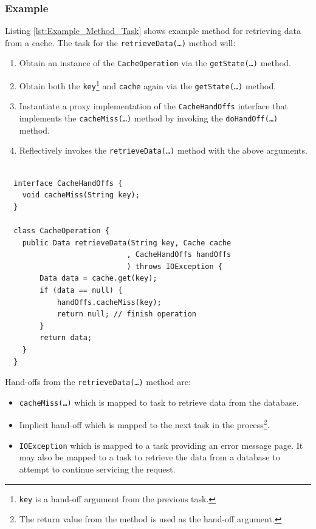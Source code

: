 \documentclass[prodmode]{style/acmlarge}
\begin{document}
\subsubsection*{Example}

Listing \ref{lst:Example_Method_Task} shows example method for retrieving
data from a cache.  The task for the \texttt{retrieve\-Data(\ldots)} method will:
\begin{enumerate}
  \item Obtain an instance of the \texttt{CacheOperation} via the \texttt{getState(\ldots)} method.
  \item Obtain both the \texttt{key}\footnote{\texttt{key} is a hand-off argument from the previous task.} and \texttt{cache} again via the \texttt{getState(\ldots)} method.
  \item Instantiate a proxy implementation of the \texttt{CacheHandOffs} interface that implements the \texttt{cacheMiss(\ldots)} method by invoking the \texttt{doHandOff(\ldots)} method. 
  \item Reflectively invokes the \texttt{retrieveData(\ldots)} method with the above arguments.
\end{enumerate}

\lstset{caption=Example developer code of a task for retrieving data from a cache\protect\footnotemark}
\begin{lstlisting}[float,label=lst:Example_Method_Task]

  interface CacheHandOffs {
    void cacheMiss(String key);
  }

  class CacheOperation {    
    public Data retrieveData(String key, Cache cache
                            , CacheHandOffs handOffs
                            ) throws IOException {
        Data data = cache.get(key);
        if (data == null) {
            handOffs.cacheMiss(key);
            return null; // finish operation
        }
        return data;
    }
  }
\end{lstlisting}

Hand-offs from the \texttt{retrieveData(\ldots)} method are:
\begin{itemize}
  \item \texttt{cacheMiss(\ldots)} which is mapped to task to retrieve data from the database.
  \item Implicit hand-off which is mapped to the next task in the process\footnote{The return value from the method is used as the hand-off argument.}.
  \item \texttt{IOException} which is mapped to a task providing an error message page.  It may also be mapped to a task to retrieve the data from a database to attempt to continue servicing the request.
\end{itemize}
\end{document}
